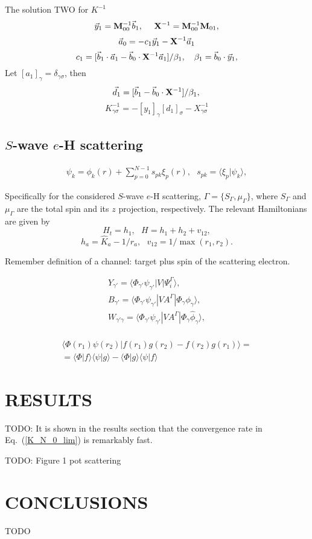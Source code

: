 \documentclass[aip
, pra
, showpacs
, aps
, twocolumn
, groupedaddress
, floatfix
]{revtex4}
\newcommand{\beq}{\begin{equation}}
\newcommand{\eeq}{\end{equation}}
\newcommand{\barr}{\begin{array}}
\newcommand{\earr}{\end{array}}
\begin{document}
The solution TWO for $K^{-1}$
\beq
\vec{y}_1 = {\bf M}_{00}^{-1} \vec{b}_1, \ \ \ \
{\bf X}^{-1} = {\bf M}_{00}^{-1} {\bf M}_{01},
\eeq
\beq
\vec{a}_0= - c_1 \vec{y}_1   - {\bf X}^{-1} \vec{a}_1
\eeq
\beq
c_1 = [ \vec{b}_1 \cdot \vec{a}_1
- \vec{b}_0 \cdot {\bf X}^{-1} \vec{a}_1 ]  / \beta_1 ,\ \ \
\beta_1 = \vec{b}_0 \cdot  \vec{y}_1,
\eeq
Let $[a_1]_\gamma = \delta_{\gamma \sigma}$, then
\beq
\vec{d}_1 = [ \vec{b}_1
- \vec{b}_0 \cdot {\bf X}^{-1} ]  / \beta_1 ,\\
\eeq
\beq
K_{\gamma \sigma}^{-1}= - [y_1]_\gamma [d_1]_\sigma   - X_{\gamma \sigma}^{-1}
\eeq



\subsection{$S$-wave $e$-H scattering}

\beq \barr{l}
\psi_k = \phi_k(r) +  \sum_{p=0}^{N-1} s_{pk} \xi_p(r), \ \ \ s_{pk} = \langle \xi_p | \psi_k \rangle,
\earr \label{Psi_} \eeq


Specifically for the considered $S$-wave $e$-H scattering,
$\Gamma=\{S_\Gamma,\mu_\Gamma\}$, where $S_\Gamma$ and $\mu_\Gamma$ are the total spin and its $z$ projection, respectively.
The relevant Hamiltonians are given by
\beq
H_t = h_1, \ \ \ H = h_1 + h_2 + v_{12},
\label{H_t} \eeq
\beq
h_a = \hat{K}_a  - 1/r_a,\ \ \ v_{12} = 1/\max{(r_{1}, r_{2})}.
\label{h_b} \eeq


Remember definition of a channel: target plus spin of the scattering electron.


\beq \barr{l}
Y_{\gamma'} = \langle \Phi_{\gamma'}  \psi_{\gamma'} |V|\Psi_i^{\Gamma} \rangle,\\
B_{\gamma'} = \langle  \Phi_{\gamma'}  \psi_{\gamma'} |VA^{\Gamma} |\Phi_{\gamma} \phi_{\gamma} \rangle,\\
W_{\gamma' \gamma} = \langle \Phi_{\gamma'}  \psi_{\gamma'} |V A^{\Gamma} |\Phi_{\gamma} \widehat{\phi}_{\gamma} \rangle,\\
\earr \label{Psi_} \eeq

\beq \barr{l}
\langle  \Phi(r_1) \psi(r_2) |f(r_1) g(r_2) - f(r_2) g(r_1) \rangle = \\
=\langle  \Phi |f \rangle  \langle  \psi |g \rangle -
\langle  \Phi |g \rangle  \langle  \psi |f \rangle
\earr \eeq


\section{RESULTS}
TODO: It is shown in the results section that the convergence rate in Eq.~(\ref{K_N_0_lim}) is remarkably fast.

TODO: Figure 1 pot scattering

\section{CONCLUSIONS}
TODO


\begin{acknowledgments}
\end{acknowledgments}





%
\end{document}
